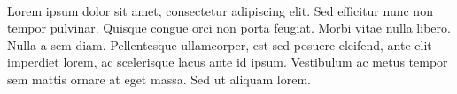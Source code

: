 \paragraph{}  Lorem ipsum dolor sit amet, consectetur adipiscing elit. Sed efficitur nunc non tempor pulvinar. Quisque congue orci non porta feugiat. Morbi vitae nulla libero. Nulla a sem diam. Pellentesque ullamcorper, est sed posuere eleifend, ante elit imperdiet lorem, ac scelerisque lacus ante id ipsum. Vestibulum ac metus tempor sem mattis ornare at eget massa. Sed ut aliquam lorem.

